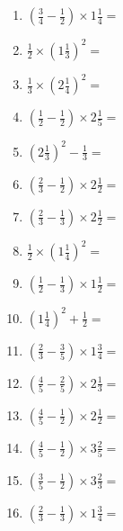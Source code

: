 \documentclass[12pt]{article}
\begin{document}
\begin{enumerate}
\item \large $ \left( \frac{3}{4} - \frac{1}{2} \right) \times 1 \frac{1}{4} = $ \vspace{1.6cm}
\item \large $ \frac{1}{2} \times \left( 1 \frac{1}{3} \right)^2 = $ \vspace{1.6cm}
\item \large $ \frac{1}{3} \times \left( 2 \frac{1}{4} \right)^2 = $ \vspace{1.6cm}
\item \large $ \left( \frac{1}{2} - \frac{1}{2} \right) \times 2 \frac{1}{5} = $ \vspace{1.6cm}
\item \large $ \left( 2 \frac{1}{3} \right)^2 - \frac{1}{3} = $ \vspace{1.6cm}
\item \large $ \left( \frac{2}{3} - \frac{1}{2} \right) \times 2 \frac{1}{2} = $ \vspace{1.6cm}
\newpage
\item \large $ \left( \frac{2}{3} - \frac{1}{3} \right) \times 2 \frac{1}{2} = $ \vspace{1.6cm}
\item \large $ \frac{1}{2} \times \left( 1 \frac{1}{4} \right)^2 = $ \vspace{1.6cm}
\item \large $ \left( \frac{1}{2} - \frac{1}{3} \right) \times 1 \frac{1}{2} = $ \vspace{1.6cm}
\item \large $ \left( 1 \frac{1}{4} \right)^2 + \frac{1}{2} = $ \vspace{1.6cm}
\item \large $ \left( \frac{2}{3} - \frac{3}{5} \right) \times 1 \frac{3}{4} = $ \vspace{1.6cm}
\item \large $ \left( \frac{4}{5} - \frac{2}{5} \right) \times 2 \frac{1}{3} = $ \vspace{1.6cm}
\item \large $ \left( \frac{4}{5} - \frac{1}{2} \right) \times 2 \frac{1}{2} = $ \vspace{1.6cm}
\item \large $ \left( \frac{4}{5} - \frac{1}{2} \right) \times 3 \frac{2}{5} = $ \vspace{1.6cm}
\item \large $ \left( \frac{3}{5} - \frac{1}{2} \right) \times 3 \frac{2}{3} = $ \vspace{1.6cm}
\item \large $ \left( \frac{2}{3} - \frac{1}{3} \right) \times 1 \frac{3}{4} = $ \vspace{1.6cm}

\end{enumerate}
\end{document}
